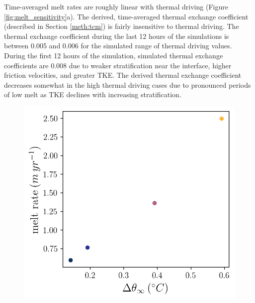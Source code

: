 \documentclass[draft]{agujournal2019}
\begin{document}
Time-averaged melt rates are roughly linear with thermal driving (Figure \ref{fig:melt_sensitivity}a). The derived, time-averaged thermal exchange coefficient (described in Section \ref{meth:tcm}) is fairly insensitive to thermal driving. The thermal exchange coefficient during the last 12 hours of the simulations is between 0.005 and 0.006 for the simulated range of thermal driving values. During the first 12 hours of the simulation, simulated thermal exchange coefficients are 0.008 due to weaker stratification near the interface, higher friction velocities, and greater TKE. The derived thermal exchange coefficient decreases somewhat in the high thermal driving cases due to pronounced periods of low melt as TKE declines with increasing stratification. 

\begin{figure}[h!]
    \centering
    \begin{minipage}{0.5\textwidth}
        \includegraphics[trim={0 0 0 0},clip,width=\textwidth]{Figures/melt_dT_cmp_dT_43h_tav13h.png}
    \end{minipage}%
    \begin{minipage}{0.5\textwidth}

\end{minipage}
\end{figure}
\end{document}
